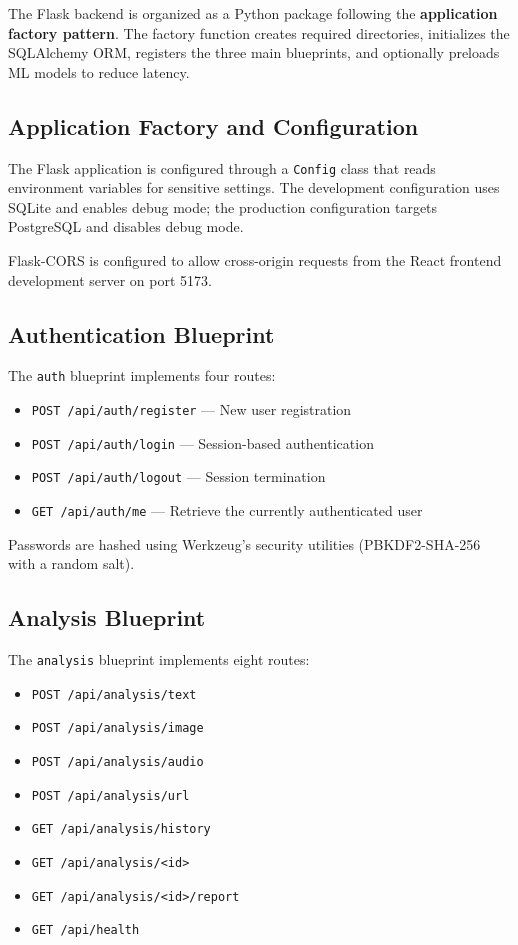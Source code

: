 \documentclass[12pt, a4paper]{report}
\begin{document}
The Flask backend is organized as a Python package following the \textbf{application factory pattern}. The factory function creates required directories, initializes the SQLAlchemy ORM, registers the three main blueprints, and optionally preloads ML models to reduce latency.

\subsection{Application Factory and Configuration}

The Flask application is configured through a \texttt{Config} class that reads environment variables for sensitive settings. The development configuration uses SQLite and enables debug mode; the production configuration targets PostgreSQL and disables debug mode.

Flask-CORS is configured to allow cross-origin requests from the React frontend development server on port 5173.

\subsection{Authentication Blueprint}

The \texttt{auth} blueprint implements four routes:

\begin{itemize}[noitemsep, leftmargin=2em]
    \item \texttt{POST /api/auth/register} --- New user registration
    \item \texttt{POST /api/auth/login} --- Session-based authentication
    \item \texttt{POST /api/auth/logout} --- Session termination
    \item \texttt{GET /api/auth/me} --- Retrieve the currently authenticated user
\end{itemize}

Passwords are hashed using Werkzeug's security utilities (PBKDF2-SHA-256 with a random salt).

\subsection{Analysis Blueprint}

The \texttt{analysis} blueprint implements eight routes:

\begin{itemize}[noitemsep, leftmargin=2em]
    \item \texttt{POST /api/analysis/text}
    \item \texttt{POST /api/analysis/image}
    \item \texttt{POST /api/analysis/audio}
    \item \texttt{POST /api/analysis/url}
    \item \texttt{GET /api/analysis/history}
    \item \texttt{GET /api/analysis/<id>}
    \item \texttt{GET /api/analysis/<id>/report}
    \item \texttt{GET /api/health}
\end{itemize}
\end{document}
